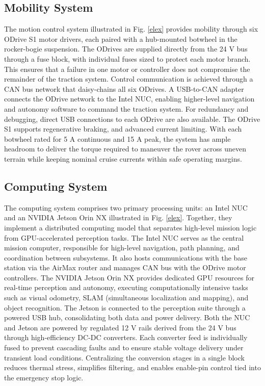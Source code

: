 \documentclass[letterpaper, 10 pt, conference]{ieeeconf}  %
\begin{document}
\subsection{Mobility System}
The motion control system illustrated in Fig. \ref{elex} provides mobility through six ODrive S1 motor drivers, each paired with a hub-mounted botwheel in the rocker-bogie suspension. The ODrives are supplied directly from the 24 V bus through a fuse block, with individual fuses sized to protect each motor branch. This ensures that a failure in one motor or controller does not compromise the remainder of the traction system. Control communication is achieved through a CAN bus network that daisy-chains all six ODrives. A USB-to-CAN adapter connects the ODrive network to the Intel NUC, enabling higher-level navigation and autonomy software to command the traction system. For redundancy and debugging, direct USB connections to each ODrive are also available. The ODrive S1 supports regenerative braking, and advanced current limiting. With each botwheel rated for 5 A continuous and 15 A peak, the system has ample headroom to deliver the torque required to maneuver the rover across uneven terrain while keeping nominal cruise currents within safe operating margins.

\subsection{Computing System}
The computing system comprises two primary processing units: an Intel NUC and an NVIDIA Jetson Orin NX illustrated in Fig. \ref{elex}. Together, they implement a distributed computing model that separates high-level mission logic from GPU-accelerated perception tasks. The Intel NUC serves as the central mission computer, responsible for high-level navigation, path planning, and coordination between subsystems. It also hosts communications with the base station via the AirMax router and manages CAN bus with the ODrive motor controllers. The NVIDIA Jetson Orin NX provides dedicated GPU resources for real-time perception and autonomy, executing computationally intensive tasks such as visual odometry, SLAM (simultaneous localization and mapping), and object recognition. The Jetson is connected to the perception suite through a powered USB hub, consolidating both data and power delivery.
Both the NUC and Jetson are powered by regulated 12 V rails derived from the 24 V bus through high-efficiency DC-DC converters. Each converter feed is individually fused to prevent cascading faults and to ensure stable voltage delivery under transient load conditions. Centralizing the conversion stages in a single block reduces thermal stress, simplifies filtering, and enables enable-pin control tied into the emergency stop logic.
\end{document}
